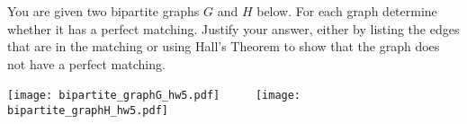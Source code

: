 
\begin{problem}
	You are given two bipartite graphs $G$ and $H$ below. For each
	graph determine whether it has a perfect matching.
	Justify your answer, either by 
	listing the edges that are in the matching or using
	Hall's Theorem to show that the graph does not have a
	perfect matching.

	\begin{center}
	\texttt{[image: bipartite\_graphG\_hw5.pdf]}
	\ \ \ \ \
	\texttt{[image: bipartite\_graphH\_hw5.pdf]}
	\end{center}
\end{problem}




